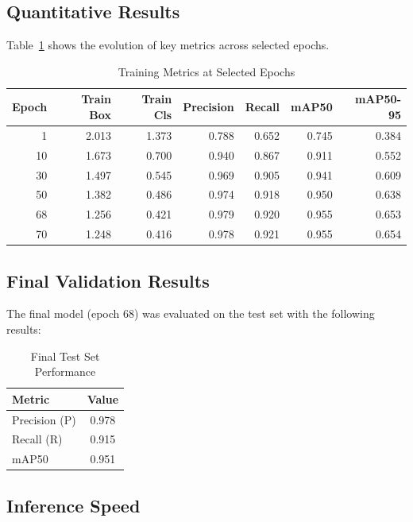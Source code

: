\documentclass[a4paper,12pt]{report}
\begin{document}
\subsection{Quantitative Results}

Table~\ref{tab:train_metrics} shows the evolution of key metrics across selected epochs.

\begin{table}[H]
\centering
\caption{Training Metrics at Selected Epochs}
\label{tab:train_metrics}
\begin{tabular}{|r|r|r|r|r|r|r|}
\hline
\textbf{Epoch} & \textbf{Train Box} & \textbf{Train Cls} & \textbf{Precision} & \textbf{Recall} & \textbf{mAP50} & \textbf{mAP50-95} \\
\hline
1 & 2.013 & 1.373 & 0.788 & 0.652 & 0.745 & 0.384 \\
10 & 1.673 & 0.700 & 0.940 & 0.867 & 0.911 & 0.552 \\
30 & 1.497 & 0.545 & 0.969 & 0.905 & 0.941 & 0.609 \\
50 & 1.382 & 0.486 & 0.974 & 0.918 & 0.950 & 0.638 \\
68 & 1.256 & 0.421 & 0.979 & 0.920 & 0.955 & 0.653 \\
70 & 1.248 & 0.416 & 0.978 & 0.921 & 0.955 & 0.654 \\
\hline
\end{tabular}
\end{table}

\subsection{Final Validation Results}

The final model (epoch 68) was evaluated on the test set with the following results:

\begin{table}[H]
\centering
\caption{Final Test Set Performance}
\label{tab:final_results}
\begin{tabular}{|l|c|}
\hline
\textbf{Metric} & \textbf{Value} \\
\hline
Precision (P) & 0.978 \\
Recall (R) & 0.915 \\
mAP50 & 0.951 \\
\hline
\end{tabular}
\end{table}

\subsection{Inference Speed}
\end{document}
